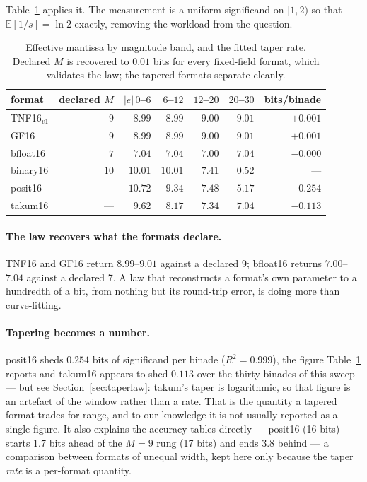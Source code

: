 \documentclass[11pt]{article}
\theoremstyle{definition}
\begin{document}
Table~\ref{tab:meff} applies it. The measurement is a uniform significand on
$[1,2)$ so that $\mathbb{E}[1/s] = \ln 2$ exactly, removing the workload from the
question.

\begin{table}[t]\centering
\caption{Effective mantissa by magnitude band, and the fitted taper rate. Declared
$M$ is recovered to $0.01$ bits for every fixed-field format, which validates the
law; the tapered formats separate cleanly.}
\label{tab:meff}
\begin{tabular}{lrrrrrr}
\toprule
format & declared $M$ & $|e|\,0$--$6$ & $6$--$12$ & $12$--$20$ & $20$--$30$ & bits/binade \\
\midrule
TNF16$_{v1}$ & $9$  & $8.99$  & $8.99$ & $9.00$ & $9.01$ & $+0.001$ \\
GF16     & $9$  & $8.99$  & $8.99$ & $9.00$ & $9.01$ & $+0.001$ \\
bfloat16 & $7$  & $7.04$  & $7.04$ & $7.00$ & $7.04$ & $-0.000$ \\
binary16 & $10$ & $10.01$ & $10.01$ & $7.41$ & $0.52$ & --- \\
posit16  & ---  & $10.72$ & $9.34$ & $7.48$ & $5.17$ & $\mathbf{-0.254}$ \\
takum16  & ---  & $9.62$  & $8.17$ & $7.34$ & $7.04$ & $\mathbf{-0.113}$ \\
\bottomrule
\end{tabular}
\end{table}

\paragraph{The law recovers what the formats declare.} TNF16 and GF16 return
$8.99$--$9.01$ against a declared 9; bfloat16 returns $7.00$--$7.04$ against a
declared 7. A law that reconstructs a format's own parameter to a hundredth of a
bit, from nothing but its round-trip error, is doing more than curve-fitting.

\paragraph{Tapering becomes a number.} posit16 sheds $0.254$ bits of significand
per binade ($R^2 = 0.999$), the figure Table~\ref{tab:meff} reports and takum16 appears to shed $0.113$ over the thirty
binades of this sweep --- but see Section~\ref{sec:taperlaw}: takum's taper is
logarithmic, so that figure is an artefact of the window rather than a rate. That is the
quantity a tapered format trades for range, and to our knowledge it is not usually
reported as a single figure. It also explains the accuracy tables directly ---
posit16 (16 bits) starts $1.7$ bits ahead of the $M{=}9$ rung (17 bits) and
ends $3.8$ behind --- a comparison between formats of unequal width, kept here
only because the taper \emph{rate} is a per-format quantity.
\end{document}
